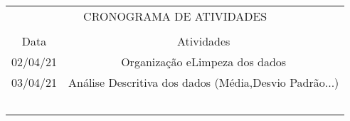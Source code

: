\documentclass[conference]{IEEEtran}
\begin{document}
\begin{table}[h]
	\centering
    \begin{small}
        \begin{tabular}{cc}
        	\\
        	\multicolumn{2}{c}{{\fontsize{13}{\baselineskip} \selectfont C}{\fontsize{11}{\baselineskip}\selectfont RONOGRAMA DE}{\fontsize{13}{\baselineskip} \selectfont A}{\fontsize{11}{\baselineskip}\selectfont TIVIDADES }}\\ 
        	\\
            \hline
            Data                    & Atividades\\
            \hline
            02/04/21                & Organização eLimpeza dos dados \\
            03/04/21                & Análise Descritiva dos dados (Média,Desvio Padrão...)  \\
                                    &  \\
                                   &  \\
                                   &  \\
                                     &  \\
                                     &  \\
            \hline
        \end{tabular}
    \end{small}
\end{table}







\nocite{*}

\end{document}
